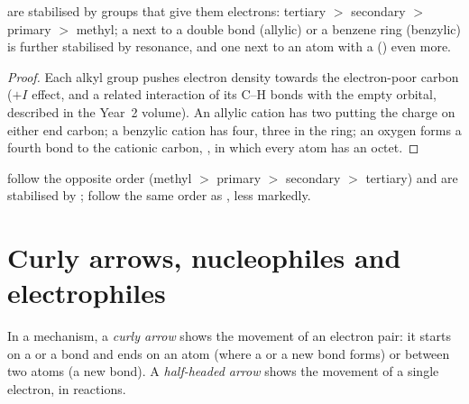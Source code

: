 \begin{proposition}\label{prop:b1:electronic-effects:carbocation-order}
 are stabilised by groups that give them electrons: tertiary
$>$ secondary $>$ primary $>$ methyl; a  next to a double bond
(allylic) or a benzene ring (benzylic) is further stabilised by
resonance, and one next to an atom with a  () even
more.
\end{proposition}

\begin{proof}
Each alkyl group pushes electron density towards the electron-poor
carbon ($+I$ effect, and a related interaction of its C--H bonds with the
empty orbital, described in the Year~2 volume). An allylic cation has
two  putting the charge on either end carbon; a
benzylic cation has four, three in the ring; an oxygen  forms a
fourth bond to the cationic carbon, , in which every atom has
an octet.
\end{proof}

 follow the opposite order (methyl $>$ primary $>$ secondary
$>$ tertiary) and are stabilised by ;  follow the
same order as , less markedly.

\section{Curly arrows, nucleophiles and electrophiles}

\begin{definition}\label{def:b1:electronic-effects:curly-arrow}
In a mechanism, a \emph{curly arrow} shows the
movement of an electron pair: it starts on a  or a bond and ends
on an atom (where a  or a new bond forms) or between two atoms (a
new bond). A \emph{half-headed arrow} shows the
movement of a single electron, in  reactions.
\end{definition}

